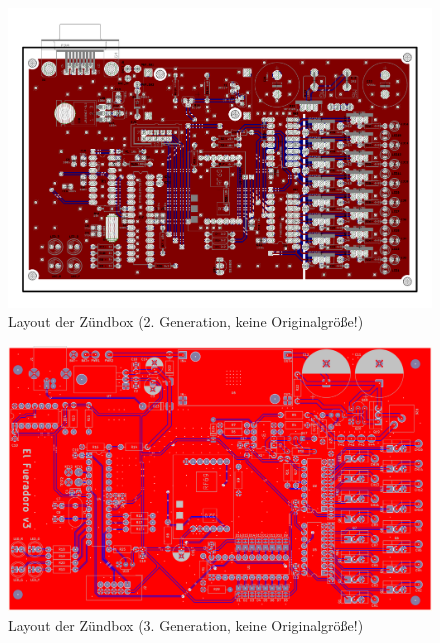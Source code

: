 \documentclass[paper=a4, parskip, numbers=noenddot, toc=listof, headsepline]{scrbook}
\begin{document}
		\begin{figure}
			\centering
			\includegraphics[angle=90, height=.95\textheight,keepaspectratio]{Bilder/Zuendboxlayout2}
			\caption{Layout der Zündbox (2. Generation, keine Originalgröße!)}
			\label{fig:zuendbox2layout}
		\end{figure}
		\begin{figure}
			\centering
			\includegraphics[angle=90, height=.95\textheight,keepaspectratio]{Bilder/Zuendboxlayout3}
			\caption{Layout der Zündbox (3. Generation, keine Originalgröße!)}
			\label{fig:zuendbox3layout}
		\end{figure}
\end{document}
